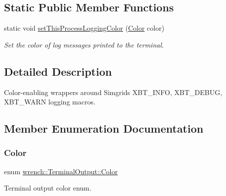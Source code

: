 \subsection*{Static Public Member Functions}
\begin{DoxyCompactItemize}
\item 
static void \hyperlink{classwrench_1_1_terminal_output_a07c9d9aaefaf7d79fc2cafaa92162813}{set\+This\+Process\+Logging\+Color} (\hyperlink{classwrench_1_1_terminal_output_a793daa5c24c3613b398f801a75bfa1e0}{Color} color)
\begin{DoxyCompactList}\small\item\em Set the color of log messages printed to the terminal. \end{DoxyCompactList}\end{DoxyCompactItemize}


\subsection{Detailed Description}
Color-\/enabling wrappers around Simgrid\textquotesingle{}s X\+B\+T\+\_\+\+I\+N\+FO, X\+B\+T\+\_\+\+D\+E\+B\+UG, X\+B\+T\+\_\+\+W\+A\+RN logging macros. 

\subsection{Member Enumeration Documentation}
\mbox{\label{classwrench_1_1_terminal_output_a793daa5c24c3613b398f801a75bfa1e0}} 
\subsubsection{\texorpdfstring{Color}{Color}}
{\footnotesize\ttfamily enum \hyperlink{classwrench_1_1_terminal_output_a793daa5c24c3613b398f801a75bfa1e0}{wrench\+::\+Terminal\+Output\+::\+Color}}



Terminal output color enum. 

